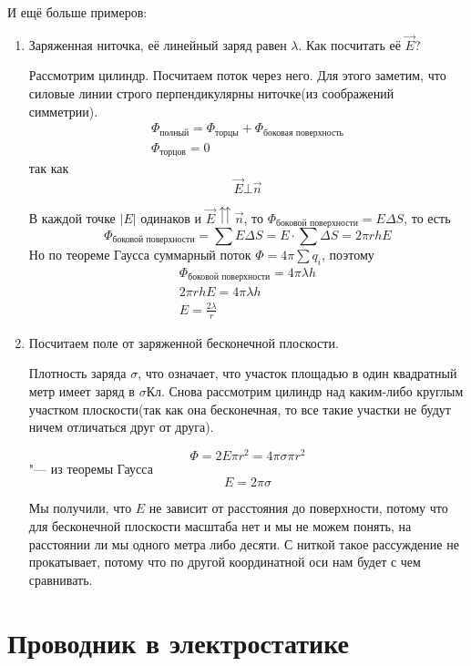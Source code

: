 И ещё больше примеров:
\begin{enumerate}
\item
	Заряженная ниточка, её линейный заряд равен $\lambda$. Как посчитать её $\vec{E}$?

	Рассмотрим цилиндр. Посчитаем поток через него. Для этого заметим, что силовые линии строго перпендикулярны ниточке(из соображений
	симметрии).
	\begin{gather*}
		\Phi_{\text{полный}} = \Phi_{\text{торцы}} + \Phi_{\text{боковая поверхность}} \\
		\Phi_{\text{торцов}} = 0
	\end{gather*}
	так как
	\[\vec{E} \bot \vec{n}\]

	В каждой точке $|E|$ одинаков и $\vec{E} \upuparrows \vec{n}$, то $\Phi_{\text{боковой поверхности}} = E\Delta S$, то есть
	\[\Phi_{\text{боковой поверхности}} = \sum E \Delta S = E \cdot \sum \Delta S = 2 \pi r h E\]
	Но по теореме Гаусса суммарный поток $\Phi = 4\pi\sum q_i$, поэтому
	\begin{gather*}
		\Phi_{\text{боковой поверхности}} = 4\pi\lambda h\\
		2\pi r h E = 4 \pi \lambda h \\
		E = \frac{2 \lambda}{r}
	\end{gather*}

\item
	Посчитаем поле от заряженной бесконечной плоскости.

	Плотность заряда $\sigma$, что означает, что участок площадью в один квадратный метр имеет заряд в $\sigma \text{Кл}$.
	Снова рассмотрим цилиндр над каким-либо круглым участком плоскости(так как она бесконечная, то все такие участки не будут
	ничем отличаться друг от друга).

	\[\Phi = 2E\pi r^2 = 4\pi\sigma\pi r^2\] "--- из теоремы Гаусса
	\[E = 2\pi\sigma\]

	Мы получили, что $E$ не зависит от расстояния до поверхности, потому что для бесконечной плоскости масштаба нет
	и мы не можем понять, на расстоянии ли мы одного метра либо десяти. С ниткой такое рассуждение не прокатывает, потому что по другой
	координатной оси нам будет с чем сравнивать.

\end{enumerate}

\section{Проводник в электростатике}

